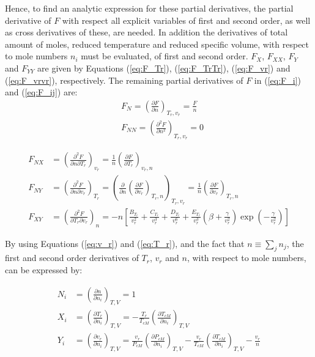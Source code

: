 \documentclass[internal,english]{sintefmemo2012}
\numberwithin{equation}{section}
\newcommand*{\pder}[2]{\left(\frac{\partial #1}{\partial #2}\right)}
\newcommand*{\pdder}[2]{\left(\frac{\partial^2 #1}{\partial #2^2}\right)}
\newcommand*{\pdcross}[3]{\left(\frac{\partial^2 #1}{\partial #2 \partial #3}\right)}
\newcommand*{\reff}[1]{(\ref{#1})}
\begin{document}
Hence, to find an analytic expression for these partial derivatives, the partial derivative of $F$ with respect all explicit variables of first and second order, as well as cross derivatives of these, are needed. In addition the derivatives of total amount of moles, reduced temperature and reduced specific volume, with respect to mole numbers $n_i$ must be evaluated, of first and second order. $F_X$, $F_{XX}$, $F_Y$ and $F_{YY}$ are given by Equations \reff{eq:F_Tr}, \reff{eq:F_TrTr}, \reff{eq:F_vr} and \reff{eq:F_vrvr}, respectively. The remaining partial derivatives of $F$ in \reff{eq:F_i} and \reff{eq:F_ij} are:
\begin{align}
\label{eq:F_n}
& F_N = \pder{F}{n}_{T_r, v_r} = \frac{F}{n} \\
& F_{NN}  = \pdder{F}{n}_{T_r,v_r} = 0
\end{align}

\begin{align}
\label{eq:F_nTr}
F_{NX} & = \pdcross{F}{n}{T_r}_{v_r} = \frac{1}{n} \pder{F}{T_r}_{v_r,n}\\
\label{eq:F_nvr}
F_{NY} & =  \pdcross{F}{n}{v_r}_{T_r} = \left(\frac{\partial}{\partial n} \pder{F}{v_r}_{T_r,n} \right)_{T_r, v_r} = \frac{1}{n} \pder{F}{v_r}_{T_r,n} \\
\label{eq:F_vrTr}
F_{X Y} & = \pdcross{F}{T_r}{v_r}_{n} = - n \left[ \frac{B_{T_r}}{v_r^2} + \frac{C_{T_r}}{v_r^3} + \frac{D_{T_r}}{v_r^6} + \frac{E_{T_r}}{v_r^3} \left( \beta + \frac{\gamma}{v_r^2} \right)\exp \left(-\frac{\gamma}{v_r^2} \right) \right]
\end{align}

By using Equations \reff{eq:v_r} and \reff{eq:T_r}, and the fact that $n \equiv \sum_j n_j$, the first and second order derivatives of $T_r$, $v_r$ and $n$, with respect to mole numbers, can be expressed by:

\begin{align}
 N_i & = \left(\frac{\partial n}{\partial n_i} \right)_{T,V} = 1 \label{eq:n_ni} \\
 X_i & = \left(\frac{\partial T_r}{\partial n_i} \right)_{T,V} = -\frac{T_r}{T_{cM}} \left(\frac{\partial T_{cM}}{\partial n_i} \right)_{T,V} \label{eq:Tr_ni} \\
 Y_i & = \left(\frac{\partial v_r}{\partial n_i} \right)_{T,V} = \frac{v_r}{P_{cM}} \left(\frac{\partial P_{cM}}{\partial n_i} \right)_{T,V} - \frac{v_r}{T_{cM}} \left( \frac{\partial T_{cM}}{\partial n_i} \right)_{T,V} -\frac{v_r}{n}\label{eq:vr_ni}
\end{align}
\end{document}
